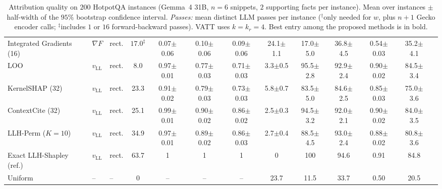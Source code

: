 \begin{table}[t]
{\begin{tabular}{lllcccccccccc}
Integrated Gradients (16) & $\nabla F$ & rect. & $17.0^\ddagger$ & 0.07{\scriptsize$\pm$0.06} & 0.10{\scriptsize$\pm$0.06} & 0.09{\scriptsize$\pm$0.06} & 24.1{\scriptsize$\pm$1.1} & 17.0{\scriptsize$\pm$5.0} & 36.8{\scriptsize$\pm$4.5} & 0.54{\scriptsize$\pm$0.03} & 35.2{\scriptsize$\pm$4.1} \\
LOO & $v_{\mathrm{LL}}$ & rect. & 8.0 & 0.97{\scriptsize$\pm$0.01} & 0.77{\scriptsize$\pm$0.03} & 0.71{\scriptsize$\pm$0.03} & 3.3{\scriptsize$\pm$0.5} & 95.5{\scriptsize$\pm$2.8} & 92.9{\scriptsize$\pm$2.4} & 0.90{\scriptsize$\pm$0.02} & 84.5{\scriptsize$\pm$3.4} \\
KernelSHAP (32) & $v_{\mathrm{LL}}$ & rect. & 23.3 & 0.91{\scriptsize$\pm$0.02} & 0.79{\scriptsize$\pm$0.03} & 0.73{\scriptsize$\pm$0.03} & 5.8{\scriptsize$\pm$0.7} & 83.5{\scriptsize$\pm$5.0} & 84.6{\scriptsize$\pm$2.5} & 0.85{\scriptsize$\pm$0.03} & 75.0{\scriptsize$\pm$3.6} \\
ContextCite (32) & $v_{\mathrm{LL}}$ & rect. & 25.1 & 0.99{\scriptsize$\pm$0.01} & 0.90{\scriptsize$\pm$0.02} & 0.86{\scriptsize$\pm$0.02} & 2.5{\scriptsize$\pm$0.3} & 94.5{\scriptsize$\pm$3.2} & 92.0{\scriptsize$\pm$2.1} & 0.90{\scriptsize$\pm$0.02} & 84.0{\scriptsize$\pm$3.5} \\
LLH-Perm ($K=10$) & $v_{\mathrm{LL}}$ & rect. & 34.9 & 0.97{\scriptsize$\pm$0.01} & 0.89{\scriptsize$\pm$0.02} & 0.86{\scriptsize$\pm$0.03} & 2.7{\scriptsize$\pm$0.4} & 88.5{\scriptsize$\pm$4.5} & 93.0{\scriptsize$\pm$2.4} & 0.88{\scriptsize$\pm$0.02} & 80.8{\scriptsize$\pm$3.6} \\
\midrule
Exact LLH-Shapley (ref.) & $v_{\mathrm{LL}}$ & rect. & 63.7 & 1 & 1 & 1 & 0 & 100 & 94.6 & 0.91 & 84.8 \\
Uniform & -- & -- & 0 & -- & -- & -- & 23.7 & 11.5 & 33.7 & 0.50 & 20.5 \\
\bottomrule
\end{tabular}%
}
\caption{Attribution quality on $200$ HotpotQA instances (Gemma~4 31B, $n = 6$ snippets, $2$ supporting facts per instance). Mean over instances $\pm$ half-width of the $95\%$ bootstrap confidence interval. \emph{Passes:} mean distinct LLM passes per instance ($^\dagger$only needed for $w$, plus $n+1$ Gecko encoder calls; $^\ddagger$includes $1$ or $16$ forward-backward passes). VATT uses $k = k_r = 4$. Best entry among the proposed methods is in bold.}
\label{tab:exp_main}
\end{table}


